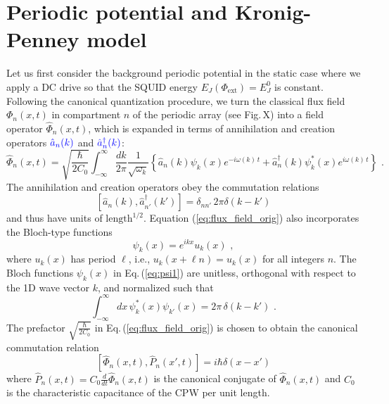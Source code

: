 \section{Periodic potential and Kronig-Penney model}\label{sec:Kronig-Penney}
%
\noindent
Let us first consider the background periodic potential in the static case where we apply a DC drive so that the SQUID energy $E_J(\Phi_{\text{ext}}) = E_J^0$ is constant. Following the canonical quantization procedure, 
\color{blue} we turn the classical flux field ${\Phi}_n(x,t)$ 
in compartment $n$ of the periodic array \color{red} (see Fig.\,X) \color{blue}
into a field operator $\hat{\Phi}_n(x,t)$, which is expanded in terms of 
annihilation and creation operators $\color{blue} \hat{a}_n(k)$ and 
$\color{blue} {\hat a}_n^\dagger(k)$:
%
\begin{equation} \label{eq:flux_field_orig}
    \hat{\Phi}_n(x,t) = \sqrt{\frac{\hbar}{2 C_0}} 
    \int_{-\infty}^{\infty}\frac{dk}{2 \pi} \frac{1}{\sqrt{\omega_k}}
    \left\{ \hat{a}_n(k) \psi_k(x)e^{-i \omega(k) \, t} + 
    \hat{a}_n^{\dagger}(k) \psi_k^*(x) e^{i \omega(k) \, t} \right\} \, \, .
\end{equation}
%
The annihilation and creation operators obey the commutation relations
%
\begin{equation} \label{eq:cra_orig}
    \left[ \hat{a}_n(k),{\hat a}_{n'}^\dagger(k') \right] = \delta_{nn'} \, 2 \pi \delta(k - k')
\end{equation}
%
and thus have units of $\text{length}^{1/2}$.
Equation (\ref{eq:flux_field_orig}) also incorporates the Bloch-type functions 
%
\begin{equation} \label{eq:psi1}
\psi_k(x) = e^{i k x} u_k(x) \, \, ,   
\end{equation}
%
where $u_k(x)$ has period $\ell$, i.e., $u_k(x + \ell n) = u_k(x)$ for all integers $n$.
The Bloch functions $\psi_k(x)$ in Eq.\,(\ref{eq:psi1}) are unitless, orthogonal with respect to 
the 1D wave vector $k$, and normalized such that
%
\begin{equation} \label{eq:psi1_norm_orig}
\int_{-\infty}^{\infty} dx \, \psi^*_k(x) \psi_{k'}(x) = 2 \pi \, \delta(k - k') \, \, .
\end{equation}
%
The prefactor $\displaystyle{\sqrt{\frac{\hbar}{2 C_0}}}$ in Eq.\,(\ref{eq:flux_field_orig}) is chosen 
to obtain the canonical commutation relation 
%
\begin{equation} \label{eq:commrelphi}
\left[ \hat{\Phi}_n(x,t), \hat{P}_n(x',t) \right] = i \hbar \delta(x-x')
\end{equation}
%
where $\hat{P}_n(x,t) = C_0 \displaystyle{\frac{d}{dt}} \hat{\Phi}_n(x,t)$ is the 
canonical conjugate of $\hat{\Phi}_n(x,t)$ and $C_0$ is the characteristic capacitance of the CPW
per unit length. 


